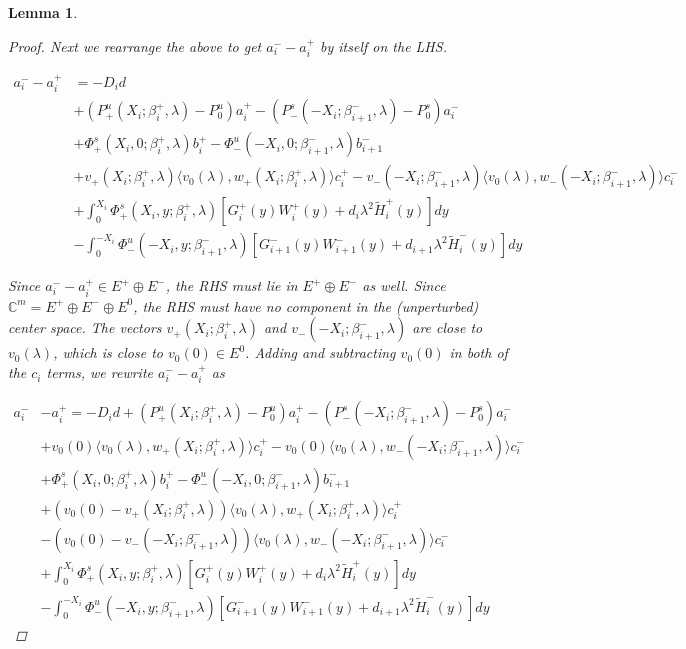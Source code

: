 \documentclass[12pt]{article}
\def\C{{\mathbb C}}
\newtheorem{lemma}{Lemma}
\begin{document}
\begin{lemma}
\begin{proof}
Next we rearrange the above to get $a_i^- - a_i^+$ by itself on the LHS.

\begin{align*}
a_i^- - a_i^+ &= -D_i d  \\
&+ (P^u_+(X_i; \beta_i^+, \lambda) - P_0^u)a_i^+ - (P^s_-(-X_i; \beta_{i+1}^-,\lambda) - P_0^s)a_i^- \\
&+ \Phi^s_+(X_i, 0; \beta_i^+, \lambda)b_i^+ - \Phi^u_-(-X_i, 0; \beta_{i+1}^-, \lambda) b_{i+1}^- \\
&+ v_+(X_i; \beta_i^+, \lambda) \langle v_0(\lambda), w_+(X_i; \beta_i^+, \lambda) \rangle c_i^+ - v_-(-X_i; \beta_{i+1}^-, \lambda) \langle v_0(\lambda), w_-(-X_i; \beta_{i+1}^-, \lambda) \rangle c_i^- \\
&+ \int_0^{X_i} \Phi^s_+(X_i, y; \beta_i^+, \lambda) [ G_i^+(y) W_i^+(y) + d_i \lambda^2 \tilde{H}_i^+(y) ] dy \\
&- \int_0^{-X_i} \Phi^u_-(-X_i, y; \beta_{i+1}^-, \lambda) [ G_{i+1}^-(y) W_{i+1}^-(y) + d_{i+1} \lambda^2 \tilde{H}_i^-(y) ] dy
\end{align*}

Since $a_i^- - a_i^+ \in E^+ \oplus E^-$, the RHS must lie in $E^+ \oplus E^-$ as well. Since $\C^m = E^+ \oplus E^- \oplus E^0$, the RHS must have no component in the (unperturbed) center space. The vectors $v_+(X_i; \beta_i^+, \lambda)$ and $v_-(-X_i; \beta_{i+1}^-, \lambda)$ are close to $v_0(\lambda)$, which is close to $v_0(0) \in E^0$. Adding and subtracting $v_0(0)$ in both of the $c_i$ terms, we rewrite $a_i^- - a_i^+$ as

\begin{align*}
a_i^- &- a_i^+ = -D_i d + (P^u_+(X_i; \beta_i^+, \lambda) - P_0^u)a_i^+ - (P^s_-(-X_i; \beta_{i+1}^-, \lambda) - P_0^s)a_i^- \\
&+ v_0(0) \langle v_0(\lambda), w_+(X_i; \beta_i^+, \lambda) \rangle c_i^+ 
- v_0(0) \langle v_0(\lambda), w_-(-X_i; \beta_{i+1}^-, \lambda) \rangle c_i^- \\
&+ \Phi^s_+(X_i, 0; \beta_i^+, \lambda)b_i^+ - \Phi^u_-(-X_i, 0; \beta_{i+1}^-, \lambda)b_{i+1}^- \\
&+ (v_0(0) - v_+(X_i; \beta_i^+, \lambda)) \langle v_0(\lambda), w_+(X_i; \beta_i^+, \lambda) \rangle c_i^+ \\
&- (v_0(0) - v_-(-X_i; \beta_{i+1}^-, \lambda)) \langle v_0(\lambda), w_-(-X_i; \beta_{i+1}^-, \lambda) \rangle c_i^- \\
&+ \int_0^{X_i} \Phi^s_+(X_i, y; \beta_i^+, \lambda) [ G_i^+(y) W_i^+(y) + d_i \lambda^2 \tilde{H}_i^+(y) ] dy \\
&- \int_0^{-X_i} \Phi^u_-(-X_i, y; \beta_{i+1}^-, \lambda) [ G_{i+1}^-(y) W_{i+1}^-(y) + d_{i+1} \lambda^2 \tilde{H}_i^-(y) ] dy
\end{align*}


\end{proof}
\end{lemma}
\end{document}
